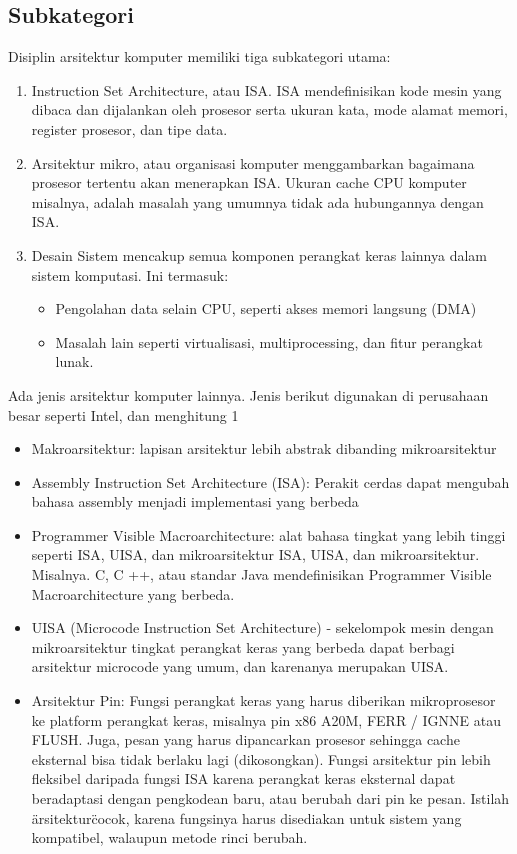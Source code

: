 {\subsection{Subkategori}
Disiplin arsitektur komputer memiliki tiga subkategori utama: \cite{hennessy2011computer}
\begin{enumerate}
\item Instruction Set Architecture, atau ISA. ISA mendefinisikan kode mesin yang dibaca dan dijalankan oleh prosesor serta ukuran kata, mode alamat memori, register prosesor, dan tipe data.
\item Arsitektur mikro, atau organisasi komputer menggambarkan bagaimana prosesor tertentu akan menerapkan ISA. \cite{laplante2000dictionary} Ukuran cache CPU komputer misalnya, adalah masalah yang umumnya tidak ada hubungannya dengan ISA.
\item Desain Sistem mencakup semua komponen perangkat keras lainnya dalam sistem komputasi. Ini termasuk:
\begin{itemize}
\item Pengolahan data selain CPU, seperti akses memori langsung (DMA)
\item Masalah lain seperti virtualisasi, multiprocessing, dan fitur perangkat lunak.
\end{itemize}
\end{enumerate}

Ada jenis arsitektur komputer lainnya. Jenis berikut digunakan di perusahaan besar seperti Intel, dan menghitung 1%
\begin{itemize}
\item Makroarsitektur: lapisan arsitektur lebih abstrak dibanding mikroarsitektur
\item Assembly Instruction Set Architecture (ISA): Perakit cerdas dapat mengubah bahasa assembly menjadi implementasi yang berbeda
\item Programmer Visible Macroarchitecture: alat bahasa tingkat yang lebih tinggi seperti ISA, UISA, dan mikroarsitektur ISA, UISA, dan mikroarsitektur. Misalnya. C, C ++, atau standar Java mendefinisikan Programmer Visible Macroarchitecture yang berbeda.
\item UISA (Microcode Instruction Set Architecture) - sekelompok mesin dengan mikroarsitektur tingkat perangkat keras yang berbeda dapat berbagi arsitektur microcode yang umum, dan karenanya merupakan UISA. 
\item Arsitektur Pin: Fungsi perangkat keras yang harus diberikan mikroprosesor ke platform perangkat keras, misalnya pin x86 A20M, FERR / IGNNE atau FLUSH. Juga, pesan yang harus dipancarkan prosesor sehingga cache eksternal bisa tidak berlaku lagi (dikosongkan). Fungsi arsitektur pin lebih fleksibel daripada fungsi ISA karena perangkat keras eksternal dapat beradaptasi dengan pengkodean baru, atau berubah dari pin ke pesan. Istilah \"arsitektur\" cocok, karena fungsinya harus disediakan untuk sistem yang kompatibel, walaupun metode rinci berubah.
\end{itemize}

}
